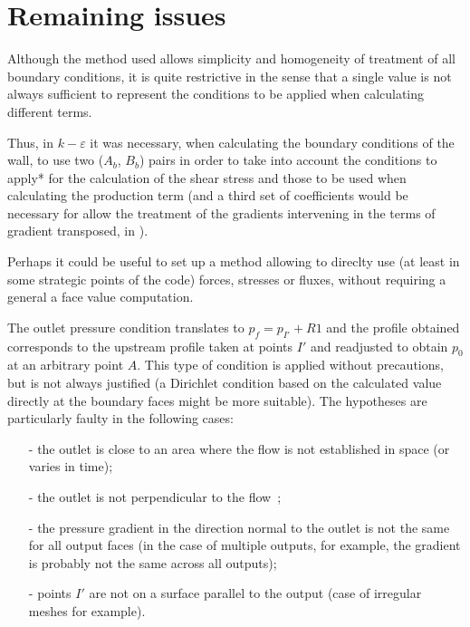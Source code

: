 \section*{Remaining issues}
Although the method used allows simplicity and
homogeneity of treatment of all boundary conditions,
it is quite restrictive in the sense that a single value is not always sufficient to
represent the conditions to be applied when calculating different terms.

Thus, in $k-\varepsilon$ it was necessary, when calculating the boundary conditions of the wall,
to use two ($A_b$, $B_b$) pairs in order to take into account the conditions to apply*
for the calculation of the shear stress and those to be used when calculating the production
term (and a third set of coefficients would be necessary for
allow the treatment of the gradients intervening in the terms of gradient
transposed, in ).

Perhaps it could be useful to set up a method
allowing to direclty use (at least in some strategic points of the code)
forces, stresses or fluxes, without requiring a general a face value computation.

The outlet pressure condition translates to $p_f=p_{I'}+R1$ and the profile obtained
corresponds to the upstream profile taken at points $I'$ and readjusted to obtain $p_0$ at
an arbitrary point $A$. This type of condition is applied without precautions, but is not
always justified (a Dirichlet condition based on the calculated value directly at the boundary
faces might be more suitable).
The hypotheses are particularly faulty in the following cases:
\begin{itemize}
\item [-] the outlet is close to an area where the flow is not established
in space (or varies in time);
\item [-] the outlet is not perpendicular to the flow~;
\item [-] the pressure gradient in the direction normal to the outlet is not
the same for all output faces (in the case of multiple outputs, for example, the gradient
is probably not the same across all outputs);
\item [-] points $I'$ are not on a surface parallel to the output
(case of irregular meshes for example).
\end{itemize}

